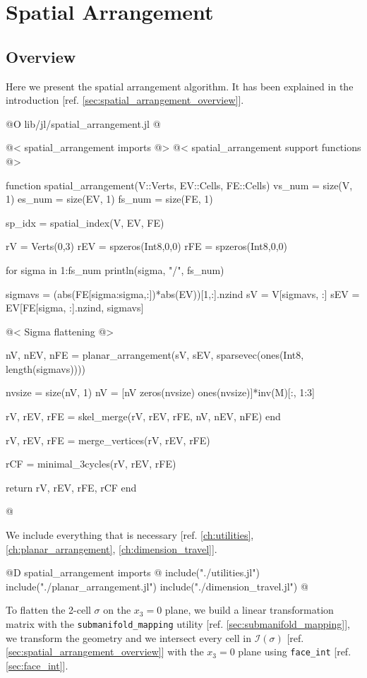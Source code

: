 \chapter{Spatial Arrangement}

\section{Overview}
Here we present the spatial arrangement algorithm.
It has been explained in the introduction [ref. \ref{sec:spatial_arrangement_overview}].

@O lib/jl/spatial_arrangement.jl
@{@< spatial\_arrangement imports @>
@< spatial\_arrangement support functions @>

function spatial_arrangement(V::Verts, EV::Cells, FE::Cells)
    vs_num = size(V, 1)
    es_num = size(EV, 1)
    fs_num = size(FE, 1)

    sp_idx = spatial_index(V, EV, FE)

    rV = Verts(0,3)
    rEV = spzeros(Int8,0,0)
    rFE = spzeros(Int8,0,0)

    for sigma in 1:fs_num
        println(sigma, "/", fs_num)

        sigmavs = (abs(FE[sigma:sigma,:])*abs(EV))[1,:].nzind 
        sV = V[sigmavs, :]
        sEV = EV[FE[sigma, :].nzind, sigmavs]

        @< Sigma flattening @>

        nV, nEV, nFE = planar_arrangement(sV, sEV, sparsevec(ones(Int8, length(sigmavs))))

        nvsize = size(nV, 1)
        nV = [nV zeros(nvsize) ones(nvsize)]*inv(M)[:, 1:3]

        rV, rEV, rFE = skel_merge(rV, rEV, rFE, nV, nEV, nFE)
    end

    rV, rEV, rFE = merge_vertices(rV, rEV, rFE)

    rCF = minimal_3cycles(rV, rEV, rFE)

    return rV, rEV, rFE, rCF
end

@}

We include everything that is necessary 
[ref. \ref{ch:utilities}, \ref{ch:planar_arrangement}, \ref{ch:dimension_travel}].

@D spatial\_arrangement imports
@{
include("./utilities.jl")
include("./planar_arrangement.jl")
include("./dimension_travel.jl")
@}

To flatten the 2-cell $\sigma$ on the $x_3=0$ plane,
we build a linear transformation matrix with the
\texttt{submanifold\_mapping} utility [ref. \ref{sec:submanifold_mapping}],
we transform the geometry and we intersect every cell in $\mathcal{I}(\sigma)$
[ref. \ref{sec:spatial_arrangement_overview}]
with the $x_3=0$ plane using \texttt{face\_int} [ref. \ref{sec:face_int}].

